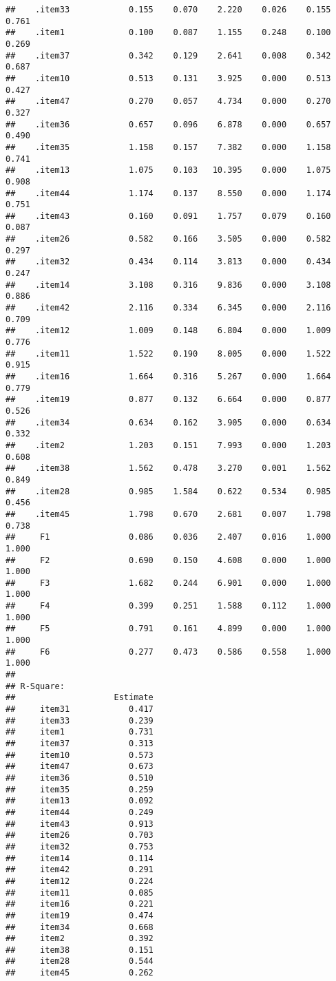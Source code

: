 \documentclass[
  english,
  man]{apa6}
\begin{document}
\begin{verbatim}
##    .item33            0.155    0.070    2.220    0.026    0.155    0.761
##    .item1             0.100    0.087    1.155    0.248    0.100    0.269
##    .item37            0.342    0.129    2.641    0.008    0.342    0.687
##    .item10            0.513    0.131    3.925    0.000    0.513    0.427
##    .item47            0.270    0.057    4.734    0.000    0.270    0.327
##    .item36            0.657    0.096    6.878    0.000    0.657    0.490
##    .item35            1.158    0.157    7.382    0.000    1.158    0.741
##    .item13            1.075    0.103   10.395    0.000    1.075    0.908
##    .item44            1.174    0.137    8.550    0.000    1.174    0.751
##    .item43            0.160    0.091    1.757    0.079    0.160    0.087
##    .item26            0.582    0.166    3.505    0.000    0.582    0.297
##    .item32            0.434    0.114    3.813    0.000    0.434    0.247
##    .item14            3.108    0.316    9.836    0.000    3.108    0.886
##    .item42            2.116    0.334    6.345    0.000    2.116    0.709
##    .item12            1.009    0.148    6.804    0.000    1.009    0.776
##    .item11            1.522    0.190    8.005    0.000    1.522    0.915
##    .item16            1.664    0.316    5.267    0.000    1.664    0.779
##    .item19            0.877    0.132    6.664    0.000    0.877    0.526
##    .item34            0.634    0.162    3.905    0.000    0.634    0.332
##    .item2             1.203    0.151    7.993    0.000    1.203    0.608
##    .item38            1.562    0.478    3.270    0.001    1.562    0.849
##    .item28            0.985    1.584    0.622    0.534    0.985    0.456
##    .item45            1.798    0.670    2.681    0.007    1.798    0.738
##     F1                0.086    0.036    2.407    0.016    1.000    1.000
##     F2                0.690    0.150    4.608    0.000    1.000    1.000
##     F3                1.682    0.244    6.901    0.000    1.000    1.000
##     F4                0.399    0.251    1.588    0.112    1.000    1.000
##     F5                0.791    0.161    4.899    0.000    1.000    1.000
##     F6                0.277    0.473    0.586    0.558    1.000    1.000
## 
## R-Square:
##                    Estimate
##     item31            0.417
##     item33            0.239
##     item1             0.731
##     item37            0.313
##     item10            0.573
##     item47            0.673
##     item36            0.510
##     item35            0.259
##     item13            0.092
##     item44            0.249
##     item43            0.913
##     item26            0.703
##     item32            0.753
##     item14            0.114
##     item42            0.291
##     item12            0.224
##     item11            0.085
##     item16            0.221
##     item19            0.474
##     item34            0.668
##     item2             0.392
##     item38            0.151
##     item28            0.544
##     item45            0.262
\end{verbatim}
\end{document}
